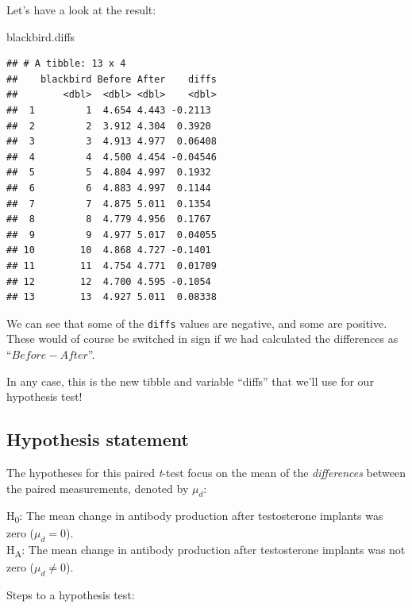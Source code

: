 \documentclass[
]{book}
\newenvironment{Shaded}{\begin{snugshade}}{\end{snugshade}}
\newcommand{\NormalTok}[1]{#1}
\begin{document}
Let's have a look at the result:

\begin{Shaded}
\begin{Highlighting}[]
\NormalTok{blackbird.diffs}
\end{Highlighting}
\end{Shaded}

\begin{verbatim}
## # A tibble: 13 x 4
##    blackbird Before After    diffs
##        <dbl>  <dbl> <dbl>    <dbl>
##  1         1  4.654 4.443 -0.2113 
##  2         2  3.912 4.304  0.3920 
##  3         3  4.913 4.977  0.06408
##  4         4  4.500 4.454 -0.04546
##  5         5  4.804 4.997  0.1932 
##  6         6  4.883 4.997  0.1144 
##  7         7  4.875 5.011  0.1354 
##  8         8  4.779 4.956  0.1767 
##  9         9  4.977 5.017  0.04055
## 10        10  4.868 4.727 -0.1401 
## 11        11  4.754 4.771  0.01709
## 12        12  4.700 4.595 -0.1054 
## 13        13  4.927 5.011  0.08338
\end{verbatim}

We can see that some of the \texttt{diffs} values are negative, and some are positive. These would of course be switched in sign if we had calculated the differences as ``\(Before - After\)''.

In any case, this is the new tibble and variable ``diffs'' that we'll use for our hypothesis test!

\subsection{Hypothesis statement}\label{paired_Htest}

The hypotheses for this paired \emph{t}-test focus on the mean of the \emph{differences} between the paired measurements, denoted by \(\mu_d\):

H\textsubscript{0}: The mean change in antibody production after testosterone implants was zero (\(\mu_d = 0\)).\\
H\textsubscript{A}: The mean change in antibody production after testosterone implants was not zero (\(\mu_d \neq 0\)).

Steps to a hypothesis test:
\end{document}
